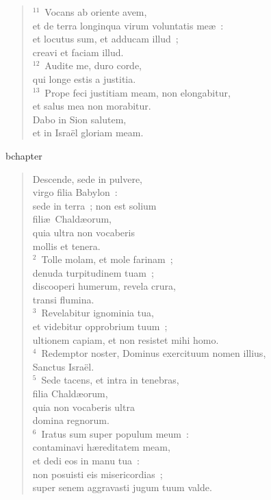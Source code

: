 \begin{verse}
${}^{11}$~Vocans ab oriente avem,\\ et de terra longinqua virum voluntatis me\ae~:\\ et locutus sum, et adducam illud~;\\ creavi et faciam illud.\\
${}^{12}$~Audite me, duro corde,\\ qui longe estis a justitia.\\
${}^{13}$~Prope feci justitiam meam, non elongabitur,\\ et salus mea non morabitur.\\ Dabo in Sion salutem,\\ et in Isra\"el gloriam meam.\end{verse}


bchapter\begin{verse}\vspace{-19pt}Descende, sede in pulvere,\\ virgo filia Babylon~:\\ sede in terra~; non est solium\\ fili\ae\ Chald\ae orum,\\ quia ultra non vocaberis\\ mollis et tenera.\\
${}^{2}$~Tolle molam, et mole farinam~;\\ denuda turpitudinem tuam~;\\ discooperi humerum, revela crura,\\ transi flumina.\\
${}^{3}$~Revelabitur ignominia tua,\\ et videbitur opprobrium tuum~;\\ ultionem capiam, et non resistet mihi homo.\\
${}^{4}$~Redemptor noster, Dominus exercituum nomen illius,\\ Sanctus Isra\"el.\\
${}^{5}$~Sede tacens, et intra in tenebras,\\ filia Chald\ae orum,\\ quia non vocaberis ultra\\ domina regnorum.\\
${}^{6}$~Iratus sum super populum meum~:\\ contaminavi h\ae reditatem meam,\\ et dedi eos in manu tua~:\\ non posuisti eis misericordias~;\\ super senem aggravasti jugum tuum valde.\\

\end{verse}
